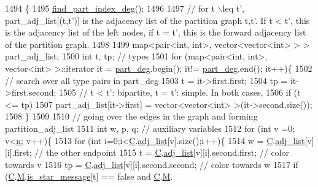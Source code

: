 \begin{DoxyCode}
1494 \{
1495   \hyperlink{classmarked__graph__encoder_a1cb2cd754108302a0437a924dc70bc0e}{find\_part\_index\_deg}();
1496 
1497   \textcolor{comment}{// for t \(\backslash\)leq t', part\_adj\_list[(t,t')] is the adjacency list of the partition graph t,t'. If t < t',
       this is the adjacency list of the left nodes, if t = t', this is the forward adjacency list of the partition
       graph.}
1498 
1499   map<pair<int, int>, vector<vector<int> > > part\_adj\_list;
1500   \textcolor{keywordtype}{int} t, tp; \textcolor{comment}{// types }
1501   \textcolor{keywordflow}{for} (map<pair<int, int>, vector<int> >::iterator it = \hyperlink{classmarked__graph__encoder_a55ea2edb2609dfc287432f61900d6ad1}{part\_deg}.begin(); it!= 
      \hyperlink{classmarked__graph__encoder_a55ea2edb2609dfc287432f61900d6ad1}{part\_deg}.end(); it++)\{
1502     \textcolor{comment}{// search over all type pairs in part\_deg}
1503     t = it->first.first;
1504     tp = it->first.second;
1505     \textcolor{comment}{// t < t': bipartite, t = t': simple. In both cases, }
1506     \textcolor{keywordflow}{if} (t <= tp)
1507       part\_adj\_list[it->first] = vector<vector<int> >(it->second.size());
1508   \}
1509 
1510   \textcolor{comment}{// going over the edges in the graph and forming partition\_adj\_list}
1511   \textcolor{keywordtype}{int} w, p, q; \textcolor{comment}{// auxiliary variables }
1512   \textcolor{keywordflow}{for} (\textcolor{keywordtype}{int} v =0; v<\hyperlink{classmarked__graph__encoder_a4c66d9fdbc14c97523715aac7e4511cb}{n}; v++)\{
1513     \textcolor{keywordflow}{for} (\textcolor{keywordtype}{int} i=0;i<\hyperlink{classmarked__graph__encoder_af82bc0653414091291cb75553a407bdb}{C}.\hyperlink{classcolored__graph_a45dce16965079286cf3f41a54a1b2ea4}{adj\_list}[v].size();i++)\{
1514       w = \hyperlink{classmarked__graph__encoder_af82bc0653414091291cb75553a407bdb}{C}.\hyperlink{classcolored__graph_a45dce16965079286cf3f41a54a1b2ea4}{adj\_list}[v][i].first; \textcolor{comment}{// the other endpoint}
1515       t = \hyperlink{classmarked__graph__encoder_af82bc0653414091291cb75553a407bdb}{C}.\hyperlink{classcolored__graph_a45dce16965079286cf3f41a54a1b2ea4}{adj\_list}[v][i].second.first; \textcolor{comment}{// color towards v}
1516       tp = \hyperlink{classmarked__graph__encoder_af82bc0653414091291cb75553a407bdb}{C}.\hyperlink{classcolored__graph_a45dce16965079286cf3f41a54a1b2ea4}{adj\_list}[v][i].second.second; \textcolor{comment}{// color towards w}
1517       \textcolor{keywordflow}{if} (\hyperlink{classmarked__graph__encoder_af82bc0653414091291cb75553a407bdb}{C}.\hyperlink{classcolored__graph_ab72c568fe12f7c849ca6bffb145aec47}{M}.\hyperlink{classgraph__message_a55ff5531a0043106369e84a7bc45e22d}{is\_star\_message}[t] == \textcolor{keyword}{false} and \hyperlink{classmarked__graph__encoder_af82bc0653414091291cb75553a407bdb}{C}.\hyperlink{classcolored__graph_ab72c568fe12f7c849ca6bffb145aec47}{M}.

\end{DoxyCode}
